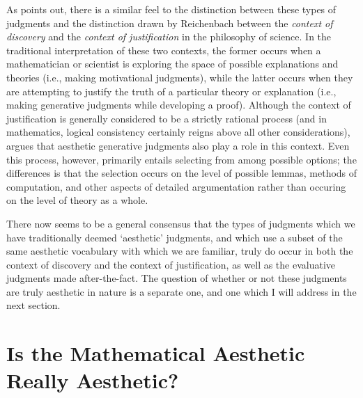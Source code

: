 \documentclass[a4paper,man,natbib]{apa6}
\begin{document}
As \cite{ivanova_aesthetic_2017} points out, there is a similar feel to the distinction between these types of judgments 
and the distinction drawn by Reichenbach \citep{sep-reichenbach} between the \textit{context of discovery} and the
\textit{context of justification} in the philosophy of science. In the traditional interpretation of these two contexts,
the former occurs when a mathematician or scientist is exploring the space of possible explanations and theories (i.e., 
making motivational judgments), while the latter occurs when they are attempting to justify the truth of a particular 
theory or explanation (i.e., making generative judgments while developing a proof). Although the context of justification 
is generally considered to be a strictly rational process (and in mathematics, logical consistency certainly reigns above all other
considerations), \cite{cellucci_mathematical_2015} argues that aesthetic generative judgments also play a role 
in this context. Even this process, however, primarily entails selecting from among possible options; the differences is
that the selection occurs on the level of possible lemmas, methods of computation, and other aspects of detailed 
argumentation rather than occuring on the level of theory as a whole.

There now seems to be a general consensus that the types of judgments which we have traditionally deemed `aesthetic' judgments,
and which use a subset of the same aesthetic vocabulary with which we are familiar, truly do occur in both the context
of discovery and the context of justification, as well as the evaluative judgments made after-the-fact. The question of 
whether or not these judgments are truly aesthetic in nature is a separate one, and one which I will address in the next
section. 



\section{Is the Mathematical Aesthetic Really Aesthetic?}
\end{document}
